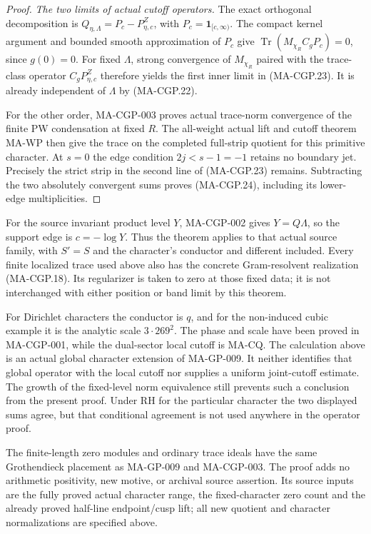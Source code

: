 \begin{proof}
\emph{The two limits of actual cutoff operators.}
The exact orthogonal decomposition is
$Q_{\eta,\Lambda}=P_c-P_{\eta,c}^Z$, with
$P_c=\mathbf1_{[c,\infty)}$.
The compact kernel argument and bounded smooth approximation
of $P_c$ give
$\operatorname{Tr}(M_{\chi_R}C_gP_c)=0$, since $g(0)=0$.
For fixed $\Lambda$, strong convergence of $M_{\chi_R}$
paired with the trace-class operator $C_gP_{\eta,c}^Z$
therefore yields the first inner limit in (MA-CGP.23).
It is already independent of $\Lambda$ by (MA-CGP.22).

For the other order, MA-CGP-003 proves actual trace-norm
convergence of the finite PW condensation at fixed $R$.
The all-weight actual lift and cutoff theorem MA-WP then
give the trace on the completed full-strip quotient for
this primitive character.  At $s=0$ the edge condition
$2j<s-1=-1$ retains no boundary jet.  Precisely the strict
strip in the second line of (MA-CGP.23) remains.
Subtracting the two absolutely convergent sums proves
(MA-CGP.24), including its lower-edge multiplicities.
\end{proof}

For the source invariant product level $Y$, MA-CGP-002 gives
$Y=Q\Lambda$, so the support edge is $c=-\log Y$.
Thus the theorem applies to that actual source family, with
$S'=S$ and the character's conductor and different included.
Every finite localized trace used above also has the concrete
Gram-resolvent realization (MA-CGP.18).  Its regularizer is
taken to zero at those fixed data; it is not interchanged
with either position or band limit by this theorem.

For Dirichlet characters the conductor is $q$, and for the
non-induced cubic example it is the analytic scale
$3\cdot269^2$.  The phase and scale have been proved in
MA-CGP-001, while the dual-sector local cutoff is MA-CQ.
The calculation above is an actual global character extension
of MA-GP-009.  It neither identifies that global operator
with the local cutoff nor supplies a uniform joint-cutoff
estimate.  The growth of the fixed-level norm equivalence
still prevents such a conclusion from the present proof.
Under RH for the particular character the two displayed
sums agree, but that conditional agreement is not used
anywhere in the operator proof.

The finite-length zero modules and ordinary trace ideals
have the same Grothendieck placement as MA-GP-009 and
MA-CGP-003.  The proof adds no arithmetic positivity,
new motive, or archival source assertion.  Its source
inputs are the fully proved actual character range,
the fixed-character zero count and the already proved
half-line endpoint/cusp lift; all new quotient and
character normalizations are specified above.
